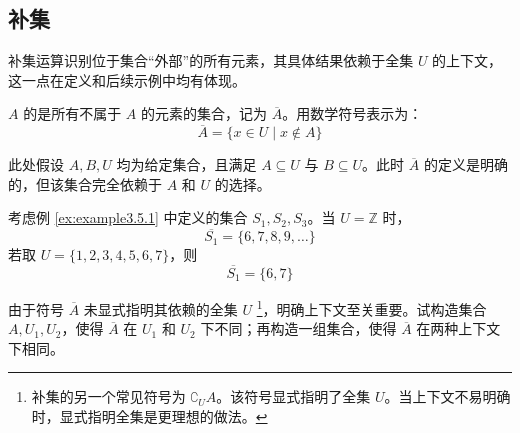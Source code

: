 \subsection{补集}

补集运算识别位于集合``外部''的所有元素，其具体结果依赖于全集 $U$ 的上下文，这一点在定义和后续示例中均有体现。

\begin{definition}
    $A$ 的是所有不属于 $A$ 的元素的集合，记为 $\overline{A}$。用数学符号表示为：
    \[\overline{A} = \{x \in U \mid x \notin A\}\]
\end{definition}

此处假设 $A, B, U$ 均为给定集合，且满足 $A \subseteq U$ 与 $B \subseteq U$。此时 $\overline{A}$ 的定义是明确的，但该集合完全依赖于 $A$ 和 $U$ 的选择。

\begin{example}
    考虑例 \ref{ex:example3.5.1} 中定义的集合 $S_1, S_2, S_3$。当 $U = \mathbb{Z}$ 时，
    \[\overline{S_1} = \{6, 7, 8, 9, \dots \}\]
    若取 $U = \{1, 2, 3, 4, 5, 6, 7\}$，则
    \[\overline{S_1} = \{6, 7\}\]
\end{example}

由于符号 $\overline{A}$ 未显式指明其依赖的全集 $U$ \footnote{补集的另一个常见符号为 $\complement_U A$。该符号显式指明了全集 $U$。当上下文不易明确时，显式指明全集是更理想的做法。}，明确上下文至关重要。试构造集合 $A, U_1, U_2$，使得 $\overline{A}$ 在 $U_1$ 和 $U_2$ 下不同；再构造一组集合，使得 $\overline{A}$ 在两种上下文下相同。
